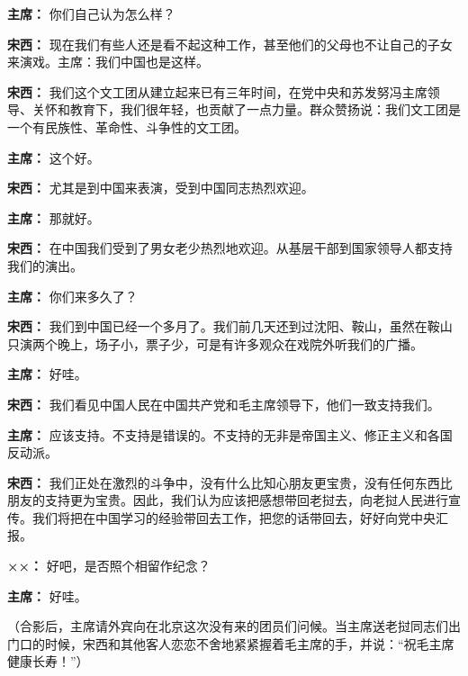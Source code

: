 \begin{duihua}
\item[\textbf{主席：}] 你们自己认为怎么样？

\item[\textbf{宋西：}] 现在我们有些人还是看不起这种工作，甚至他们的父母也不让自己的子女来演戏。主席：我们中国也是这样。

\item[\textbf{宋西：}] 我们这个文工团从建立起来已有三年时间，在党中央和苏发努冯主席领导、关怀和教育下，我们很年轻，也贡献了一点力量。群众赞扬说：我们文工团是一个有民族性、革命性、斗争性的文工团。

\item[\textbf{主席：}] 这个好。

\item[\textbf{宋西：}] 尤其是到中国来表演，受到中国同志热烈欢迎。

\item[\textbf{主席：}] 那就好。

\item[\textbf{宋西：}] 在中国我们受到了男女老少热烈地欢迎。从基层干部到国家领导人都支持我们的演出。

\item[\textbf{主席：}] 你们来多久了？

\item[\textbf{宋西：}] 我们到中国已经一个多月了。我们前几天还到过沈阳、鞍山，虽然在鞍山只演两个晚上，场子小，票子少，可是有许多观众在戏院外听我们的广播。

\item[\textbf{主席：}] 好哇。

\item[\textbf{宋西：}] 我们看见中国人民在中国共产党和毛主席领导下，他们一致支持我们。

\item[\textbf{主席：}] 应该支持。不支持是错误的。不支持的无非是帝国主义、修正主义和各国反动派。

\item[\textbf{宋西：}] 我们正处在激烈的斗争中，没有什么比知心朋友更宝贵，没有任何东西比朋友的支持更为宝贵。因此，我们认为应该把感想带回老挝去，向老挝人民进行宣传。我们将把在中国学习的经验带回去工作，把您的话带回去，好好向党中央汇报。

\item[\textbf{××：}] 好吧，是否照个相留作纪念？

\item[\textbf{主席：}] 好哇。

（合影后，主席请外宾向在北京这次没有来的团员们问候。当主席送老挝同志们出门口的时候，宋西和其他客人恋恋不舍地紧紧握着毛主席的手，并说：“祝毛主席健康长寿！”）
\end{duihua}

